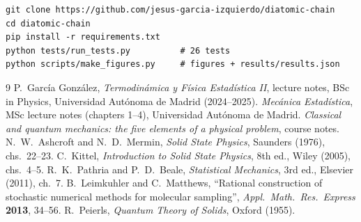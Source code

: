 \documentclass[11pt,a4paper]{article}
\begin{document}
\begin{verbatim}
git clone https://github.com/jesus-garcia-izquierdo/diatomic-chain
cd diatomic-chain
pip install -r requirements.txt
python tests/run_tests.py          # 26 tests
python scripts/make_figures.py     # figures + results/results.json
\end{verbatim}

\begin{thebibliography}{9}
 P.~García González, \emph{Termodinámica y Física Estadística II},
  lecture notes, BSc in Physics, Universidad Autónoma de Madrid (2024--2025).
 \emph{Mecánica Estadística}, MSc lecture notes (chapters 1--4),
  Universidad Autónoma de Madrid.
 \emph{Classical and quantum mechanics: the five elements of a
  physical problem}, course notes.
 N.~W.~Ashcroft and N.~D.~Mermin, \emph{Solid State Physics},
  Saunders (1976), chs.~22--23.
 C.~Kittel, \emph{Introduction to Solid State Physics}, 8th ed.,
  Wiley (2005), chs.~4--5.
 R.~K.~Pathria and P.~D.~Beale, \emph{Statistical Mechanics},
  3rd ed., Elsevier (2011), ch.~7.
 B.~Leimkuhler and C.~Matthews, ``Rational construction of stochastic
  numerical methods for molecular sampling'', \emph{Appl.\ Math.\ Res.\ Express}
  \textbf{2013}, 34--56.
 R.~Peierls, \emph{Quantum Theory of Solids}, Oxford (1955).
\end{thebibliography}
\end{document}
